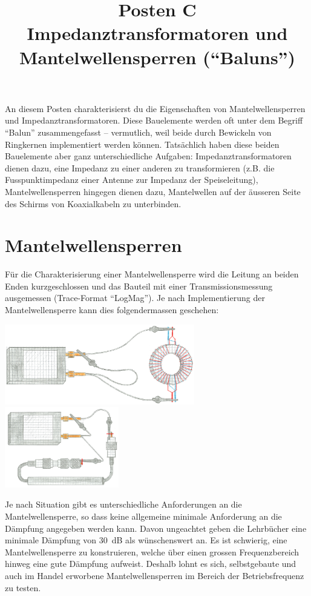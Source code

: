 \documentclass[a4paper,11pt,parskip=half,headings=small,DIV=11,notitlepage,abstract=on]{scrartcl}
\title{Posten C\\Impedanztransformatoren und Mantelwellensperren (``Baluns'')}
\author{}
\date{}
\begin{document}
\maketitle
\vspace{-2cm}

An diesem Posten charakterisierst du die Eigenschaften von Mantelwellensperren
und Impedanztransformatoren. Diese Bauelemente werden oft unter dem Begriff
``Balun'' zusammengefasst -- vermutlich, weil beide durch Bewickeln von
Ringkernen implementiert werden können. Tatsächlich haben diese beiden
Bauelemente aber ganz unterschiedliche Aufgaben: Impedanztransformatoren dienen
dazu, eine Impedanz zu einer anderen zu transformieren (z.B. die
Fusspunktimpedanz einer Antenne zur Impedanz der Speiseleitung),
Mantelwellensperren hingegen dienen dazu, Mantelwellen auf der äusseren Seite
des Schirms von Koaxialkabeln zu unterbinden.

\section{Mantelwellensperren}
Für die Charakterisierung einer Mantelwellensperre wird die Leitung an beiden
Enden kurzgeschlossen und das Bauteil mit einer Transmissionsmessung
ausgemessen (Trace-Format ``LogMag''). Je nach Implementierung der
Mantelwellensperre kann dies folgendermassen geschehen:

\includegraphics[height=3.5cm]{../skript/figures/illustration_DG0SA.png}\hfill
\includegraphics[height=3.5cm]{../skript/figures/illustration_w2du_short.png}

Je nach Situation gibt es unterschiedliche Anforderungen an die
Mantelwellensperre, so dass keine allgemeine minimale Anforderung an die
Dämpfung angegeben werden kann. Davon ungeachtet geben die Lehrbücher eine
minimale Dämpfung von 30~dB als wünschenswert an. Es ist schwierig, eine
Mantelwellensperre zu konstruieren, welche über einen grossen Frequenzbereich
hinweg eine gute Dämpfung aufweist. Deshalb lohnt es sich, selbstgebaute und
auch im Handel erworbene Mantelwellensperren im Bereich der Betriebsfrequenz zu
testen.
\end{document}
